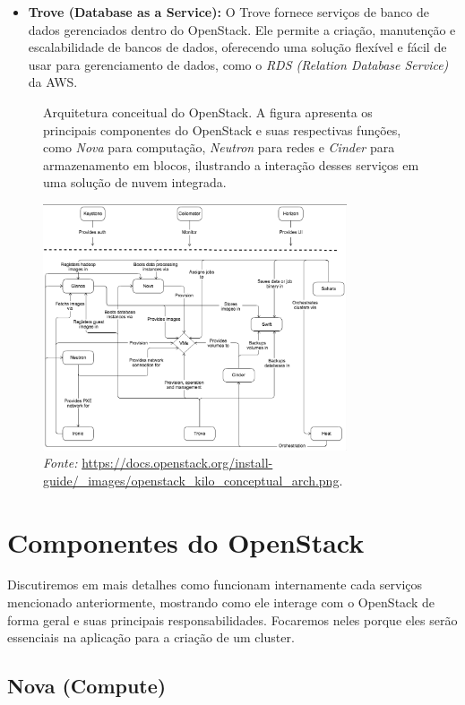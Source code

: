 \begin{itemize}
    \item \textbf{Trove (Database as a Service): } O Trove fornece serviços de banco de dados gerenciados dentro do OpenStack. Ele permite a criação, manutenção e escalabilidade de bancos de dados, oferecendo uma solução flexível e fácil de usar para gerenciamento de dados, como o \textit{RDS (Relation Database Service)} da AWS.
\end{itemize}


\begin{figure}[htbp]
  \centering
  \caption{Arquitetura conceitual do OpenStack. A figura apresenta os principais componentes do OpenStack e suas respectivas funções, como \textit{Nova} para computação, \textit{Neutron} para redes e \textit{Cinder} para armazenamento em blocos, ilustrando a interação desses serviços em uma solução de nuvem integrada.}
  \includegraphics[width=0.8\textwidth]{images/architecture_conceptual_openstack.png}
  \caption*{\textit{Fonte:} \url{https://docs.openstack.org/install-guide/_images/openstack_kilo_conceptual_arch.png}.}
  \label{fig:openstack_conceptual_architecture}
\end{figure}


\section{Componentes do OpenStack}

Discutiremos em mais detalhes como funcionam internamente cada serviços mencionado anteriormente, mostrando como ele interage com o OpenStack de forma geral e suas principais responsabilidades. Focaremos neles porque eles serão essenciais na aplicação para a criação de um cluster.


\subsection{Nova (Compute)}

